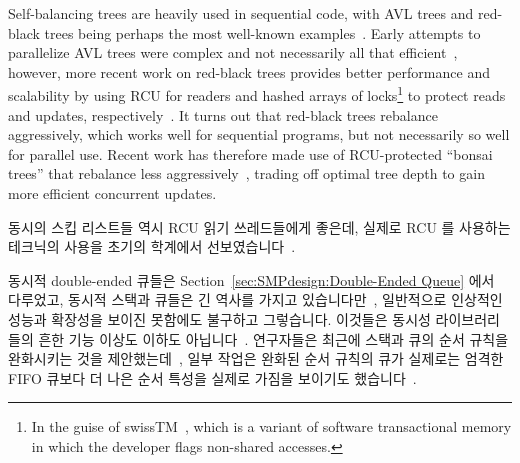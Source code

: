 Self-balancing trees are heavily used in sequential code, with
AVL trees and red-black trees being perhaps the most well-known
examples~\cite{ThomasHCorman2001Algorithms}.
Early attempts to parallelize AVL trees were complex and not necessarily
all that efficient~\cite{Ellis80},
however, more recent work on red-black trees provides better
performance and scalability by using RCU for readers and hashed arrays
of locks\footnote{
	In the guise of swissTM~\cite{AleksandarDragovejic2011STMnotToy},
	which is a variant of software transactional memory in which
	the developer flags non-shared accesses.}
to protect reads and updates,
respectively~\cite{PhilHoward2011RCUTMRBTree,PhilipWHoward2013RCUrbtree}.
It turns out that red-black trees rebalance aggressively, which works
well for sequential programs, but not necessarily so well for parallel
use.
Recent work has therefore made use of RCU-protected ``bonsai trees''
that rebalance less aggressively~\cite{AustinClements2012RCULinux:mmapsem},
trading off optimal tree depth to gain more efficient concurrent updates.
\fi

동시의 스킵 리스트들 역시 RCU 읽기 쓰레드들에게 좋은데, 실제로 RCU 를 사용하는
테크닉의 사용을 초기의 학계에서 선보였습니다~\cite{Pugh90}.

동시적 double-ended 큐들은
Section~\ref{sec:SMPdesign:Double-Ended Queue} 에서 다루었고,
동시적 스택과 큐들은 긴 역사를 가지고 있습니다만~\cite{Treiber86},
일반적으로 인상적인 성능과 확장성을 보이진 못함에도 불구하고 그렇습니다.
이것들은 동시성 라이브러리들의 흔한 기능 이상도 이하도
아닙니다~\cite{PaulMcKenney2013LWNURCUqueuestack}.
연구자들은 최근에 스택과 큐의 순서 규칙을 완화시키는 것을
제안했는데~\cite{Shavit:2011:DSM:1897852.1897873}, 일부 작업은 완화된 순서
규칙의 큐가 실제로는 엄격한 FIFO 큐보다 더 나은 순서 특성을 실제로 가짐을
보이기도
했습니다~\cite{AndreasHaas2012FIFOisnt,ChristophMKirsch2012FIFOisntTR,AndreasHaas2013CFRelaxedQueues}.

